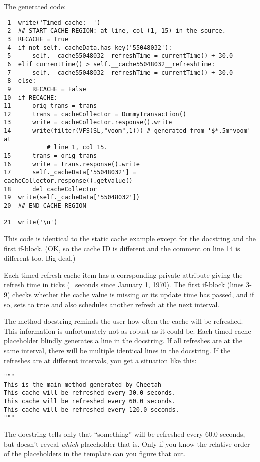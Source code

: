 The generated code:
\begin{verbatim}
 1  write('Timed cache:  ')
 2  ## START CACHE REGION: at line, col (1, 15) in the source.
 3  RECACHE = True
 4  if not self._cacheData.has_key('55048032'):
 5      self.__cache55048032__refreshTime = currentTime() + 30.0
 6  elif currentTime() > self.__cache55048032__refreshTime:
 7      self.__cache55048032__refreshTime = currentTime() + 30.0
 8  else:
 9      RECACHE = False
10  if RECACHE:
11      orig_trans = trans
12      trans = cacheCollector = DummyTransaction()
13      write = cacheCollector.response().write
14      write(filter(VFS(SL,"voom",1))) # generated from '$*.5m*voom' at 
            # line 1, col 15.
15      trans = orig_trans
16      write = trans.response().write
17      self._cacheData['55048032'] = cacheCollector.response().getvalue()
18      del cacheCollector
19  write(self._cacheData['55048032'])
20  ## END CACHE REGION
    
21  write('\n')
\end{verbatim}

This code is identical to the static cache example except for the docstring
and the first if-block.  (OK, so the cache ID is different and the comment on
line 14 is different too.  Big deal.)

Each timed-refresh cache item has a corrsponding private attribute 
 giving the refresh time
in ticks (=seconds since January 1, 1970).  The first if-block (lines 3-9)
checks whether the cache value is missing or its update time has passed, and if
so, sets  to true and also schedules another refresh at the next
interval.

The method docstring reminds the user how often the cache will be refreshed.
This information is unfortunately not as robust as it could be.  Each
timed-cache placeholder blindly generates a line in the docstring.  If all
refreshes are at the same interval, there will be multiple identical lines
in the docstring.  If the refreshes are at different intervals, you get a
situation like this:
\begin{verbatim}
"""
This is the main method generated by Cheetah
This cache will be refreshed every 30.0 seconds.
This cache will be refreshed every 60.0 seconds.
This cache will be refreshed every 120.0 seconds.
"""
\end{verbatim}
The docstring tells only that ``something'' will be refreshed every 60.0
seconds, but doesn't reveal {\em which} placeholder that is.  Only if you
know the relative order of the placeholders in the template can you figure
that out.

